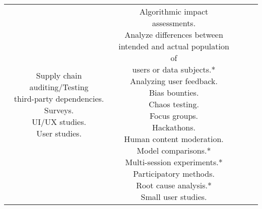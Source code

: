 \documentclass[fleqn]{article}
\begin{document}
\begin{landscape}
\begin{table}[H]
\begin{tabular}{|c|c|c|c|c|}
{			\textbullet\hspace{3pt} Supply chain auditing/Testing \\\hspace{10pt}third-party dependencies. \\			
			\textbullet\hspace{3pt} Surveys. \\			
			\textbullet\hspace{3pt} UI/UX studies. \\			
			\textbullet\hspace{3pt} User studies. \\
		}
		&
		\makecell[l]{ 	
			\textbullet\hspace{3pt} Algorithmic impact assessments.\\ 	
			\textbullet\hspace{3pt} Analyze differences between \\\hspace{10pt}intended and actual population of \\\hspace{10pt}users or data subjects.*\\ 	
			\textbullet\hspace{3pt} Analyzing user feedback. \\	
			\textbullet\hspace{3pt} Bias bounties. \\ 	
			\textbullet\hspace{3pt} Chaos testing. \\
			\textbullet\hspace{3pt} Focus groups. \\
			\textbullet\hspace{3pt} Hackathons. \\
			\textbullet\hspace{3pt} Human content moderation. \\
			\textbullet\hspace{3pt} Model comparisons.* \\
			\textbullet\hspace{3pt} Multi-session experiments.* \\
			\textbullet\hspace{3pt} Participatory methods. \\			
			\textbullet\hspace{3pt} Root cause analysis.* \\			
			\textbullet\hspace{3pt} Small user studies. \\			
}
\end{tabular}
\end{table}
\end{landscape}
\end{document}
